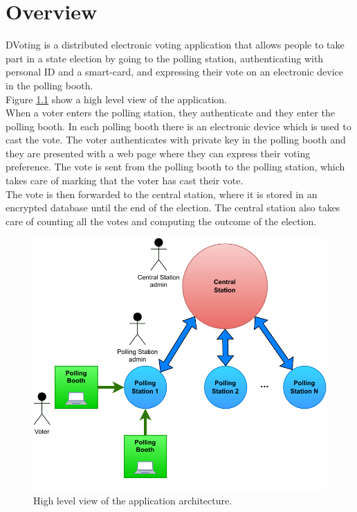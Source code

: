 %       
%
\chapter{Overview}\label{ch:overview}
DVoting is a distributed electronic voting application that allows people to take part in a state election by going to the polling station, authenticating with personal ID and a smart-card, and expressing their vote on an electronic device in the polling booth.\\

Figure \ref{fig:high_lev_arch} show a high level view of the application.\\
When a voter enters the polling station, they authenticate and they enter the polling booth. In each polling booth there is an electronic device which is used to cast the vote. The voter authenticates with private key in the polling booth and they are presented with a web page where they can express their voting preference. The vote is sent from the polling booth to the polling station, which takes care of marking that the voter has cast their vote.\\
The vote is then forwarded to the central station, where it is stored in an encrypted database until the end of the election. The central station also takes care of counting all the votes and computing the outcome of the election.\\

\begin{figure}
    \begin{center}
        \includegraphics[scale=1]{img/high_lev_arch.pdf}
    \end{center}
    \vspace*{-0.5cm}
    \caption{High level view of the application architecture.}
    \label{fig:high_lev_arch}
\end{figure}




